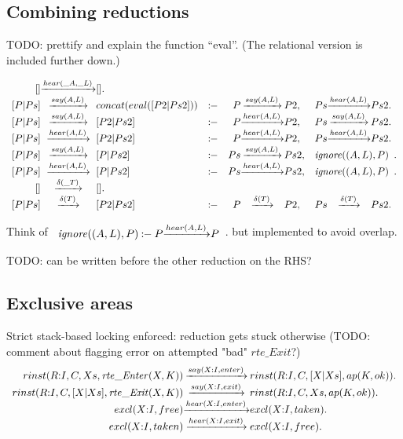 \subsection{Combining reductions}

TODO: prettify and explain the function ``eval''. (The relational version is included further down.)

\[
\begin{array}{r@{}c@{}lcr@{}c@{}lr@{}c@{}l}
  \Preduce{[]}{hear(\_A,\_L)}{[]}. & &
\\\Preduce{[ P | Ps ]}{say(A,L)} {concat(eval([P2 | Ps2]))}  &\Pif& \Preduce{P}{say(A,L)}{P2}  ,&  \Preduce{Ps}{hear(A,L)}{Ps2}.
\\\Preduce{[ P | Ps ]}{say(A,L)} {[ P2 | Ps2 ]}  &\Pif& \Preduce{P} {hear(A,L)}{P2}   ,&  \Preduce{Ps}{say(A,L)} {Ps2} .
\\\Preduce{[ P | Ps ]}{hear(A,L)}{[ P2 | Ps2 ]}  &\Pif& \Preduce{P} {hear(A,L)}{P2}   ,&  \Preduce{Ps}{hear(A,L)}{Ps2} .
\\\Preduce{[ P | Ps ]}{say(A,L)} {[ P  | Ps2 ]}  &\Pif& \Preduce{Ps}{say(A,L)} {Ps2}  ,&  \multicolumn{3}{c}{\Pignore{((A,L),P)}}    .
\\\Preduce{[ P | Ps ]}{hear(A,L)}{[ P  | Ps2 ]}  &\Pif& \Preduce{Ps}{hear(A,L)}{Ps2}  ,&  \multicolumn{3}{c}{\Pignore{((A,L),P)}}    .
\\\Preduce{[]}{\delta(\_T)}{[]}. & &
\\\Preduce{[ P | Ps ]}{\delta(T)}{[ P2 | Ps2 ]}  &\Pif& \Preduce{P}{\delta(T)}{P2}    ,&  \Preduce{Ps}{\delta(T)}{Ps2}  .
\end{array}
\]

Think of
\(\begin{array}{r@{}c@{}l}\Pignore{((A,L),P)} \Pif
  \Preduce{P}{hear(A,L)}{P}\end{array}\).
but implemented to avoid overlap.

TODO: can  be written before the other reduction on the RHS?



\subsection{Exclusive areas}
\newcommand{\rte}[1]{\ensuremath{\mathit{rte\_#1}}}

Strict stack-based locking enforced: reduction gets stuck otherwise
(TODO: comment about flagging error on attempted "bad" \rte{Exit}?)
\[
\begin{array}{r@{}c@{}l}
  \Preduce{rinst(R{:}I, C, Xs,     \rte{Enter}(X,K))}{say(X{:}I,enter)} {rinst(R{:}I, C, [X|Xs], ap(K,ok))}  .
\\\Preduce{rinst(R{:}I, C, [X|Xs], \rte{Exit}(X,K))} {say(X{:}I,exit)}  {rinst(R{:}I, C, Xs,     ap(K,ok))}      .
\\\Preduce{excl(X{:}I, free)}                     {hear(X{:}I,enter)}{excl(X{:}I, taken)}                 .
\\\Preduce{excl(X{:}I, taken)}                    {hear(X{:}I,exit)} {excl(X{:}I, free)}                  .
\end{array}
\]
